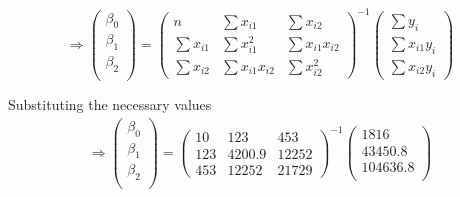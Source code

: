 \documentclass[
]{article}
\begin{document}
\begin{equation*}
\Rightarrow 
  \begin{pmatrix}
      \beta_0\\
      \beta_1\\
      \beta_2\\
    \end{pmatrix}
    =
    \begin{pmatrix}
    n & \sum x_{i1} & \sum x_{i2} \\
    \sum x_{i1} & \sum x_{i1}^2 & \sum x_{i1}x_{i2}\\
    \sum x_{i2} & \sum x_{i1}x_{i2} & \sum x_{i2}^2
    \end{pmatrix}^{-1}
    
  \begin{pmatrix}
    \sum y_i \\
    \sum x_{i1}y_i \\
    \sum x_{i2}y_i
  \end{pmatrix}
\end{equation*}

Substituting the necessary values \begin{align*}
  \Rightarrow
  \begin{pmatrix}
    \beta_0\\
    \beta_1\\
    \beta_2\\
  \end{pmatrix}
  =
  \begin{pmatrix}
    10 & 123 & 453 \\
    123 & 4200.9 & 12252 \\
    453 & 12252 & 21729
  \end{pmatrix}^{-1}
  
  \begin{pmatrix}
    1816\\
    43450.8\\
    104636.8\\
  \end{pmatrix}
\end{align*}
\end{document}
